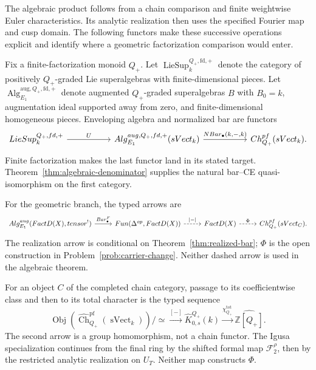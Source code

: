 \documentclass[11pt,reqno]{amsart}
\theoremstyle{definition}
\theoremstyle{remark}
\providecommand{\FactD}{\mathrm{FactD}}
\providecommand{\Alg}{\mathrm{Alg}}
\newcommand{\Barc}{\operatorname{Bar}}
\begin{document}
The algebraic product follows from a chain comparison and finite
weightwise Euler characteristics.  Its analytic realization then uses
the specified Fourier map and cusp domain.  The following functors make
these successive operations explicit and identify where a geometric
factorization comparison would enter.

Fix a finite-factorization monoid \(Q_+\).  Let
\(\operatorname{LieSup}^{Q_+,\mathrm{fd},+}_k\) denote the category of
positively \(Q_+\)-graded Lie superalgebras with finite-dimensional
pieces.  Let
\(\operatorname{Alg}^{\mathrm{aug},Q_+,\mathrm{fd},+}_{E_1}\)
denote augmented \(Q_+\)-graded superalgebras \(B\) with \(B_0=k\),
augmentation ideal supported away from zero, and finite-dimensional
homogeneous pieces.  Enveloping algebra and normalized bar are functors
\[
\begin{tikzcd}[column sep=5.2em]
 \operatorname{LieSup}^{Q_+,\mathrm{fd},+}_k
   \arrow[r,"U"]
 & \operatorname{Alg}^{\mathrm{aug},Q_+,\mathrm{fd},+}_{E_1}
   (\operatorname{sVect}_k)
   \arrow[r,"{N\Barc_\bullet(k,-,k)}"]
 & \widehat{\operatorname{Ch}}^{\mathrm{pf}}_{Q_+}
   (\operatorname{sVect}_k).
\end{tikzcd}
\]
Finite factorization makes the last functor land in its stated target.
Theorem~\ref{thm:algebraic-denominator} supplies the natural
bar--CE quasi-isomorphism on the first category.

For the geometric branch, the typed arrows are
\[
\begin{tikzcd}[column sep=2.5em]
 \Alg^{\mathrm{aug}}_{E_1}(\FactD(X),\otimes^!)
   \arrow[r,"\Barc^{\mathcal F}_\bullet"]
 & \operatorname{Fun}(\Delta^{op},\FactD(X))
   \arrow[r,dashed,"\lvert-\rvert"]
 & \FactD(X)
   \arrow[r,dashed,"\Phi"]
 & \widehat{\operatorname{Ch}}^{\mathrm{pf}}_{Q_+}
   (\operatorname{sVect}_{\mathbb C}).
\end{tikzcd}
\]
The realization arrow is conditional on
Theorem~\ref{thm:realized-bar}; \(\Phi\) is the open construction in
Problem~\ref{prob:carrier-change}.  Neither dashed arrow is used in the
algebraic theorem.

For an object \(C\) of the completed chain category, passage to its
coefficientwise class and then to its total character is the typed
sequence
\[
 \operatorname{Obj}\!\left(
   \widehat{\operatorname{Ch}}^{\mathrm{pf}}_{Q_+}
   (\operatorname{sVect}_k)\right)\big/\simeq
 \xrightarrow{[-]}
 \widehat K_{0,s}^{Q_+}(k)
 \xrightarrow{\chi_{Q_+}^{\mathrm{tot}}}
 \widehat{\mathbb Z[Q_+]}.
\]
The second arrow is a group homomorphism, not a chain functor.  The
Igusa specialization continues from the final ring by the shifted
formal map \(\mathcal F_2^\rho\), then by the restricted analytic
realization on \(U_T\).  Neither map constructs \(\Phi\).
\end{document}

